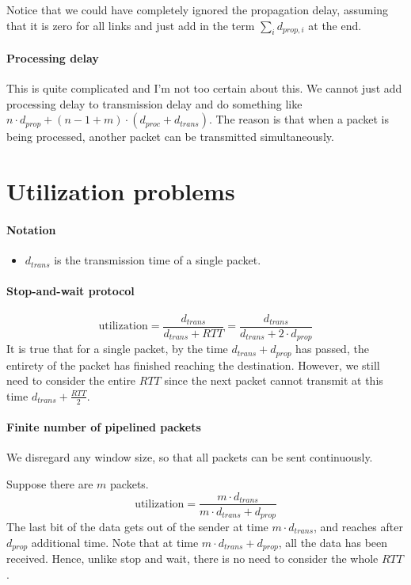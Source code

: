 \documentclass[a4paper]{article}
\newcommand{\rbracket}[1]{\left(#1\right)} %
\begin{document}
Notice that we could have completely ignored the propagation delay, assuming that it is zero for all links and just add in the term $\sum_i d_{prop, i}$ at the end.

\paragraph{Processing delay} This is quite complicated and I'm not too certain about this. We cannot just add processing delay to transmission delay and do something like $n\cdot d_{prop} + (n - 1 + m)\cdot \rbracket{d_{proc} + d_{trans}}$. The reason is that when a packet is being processed, another packet can be transmitted simultaneously.


\section{Utilization problems}
\paragraph{Notation}
\begin{itemize}
	\item $d_{trans}$ is the transmission time of a single packet.
\end{itemize}

\paragraph{Stop-and-wait protocol}

\begin{equation}
	\text{utilization} = \frac{d_{trans}}{d_{trans} + RTT} = \frac{d_{trans}}{d_{trans} + 2\cdot d_{prop}}
\end{equation}
It is true that for a single packet, by the time $d_{trans} + d_{prop}$ has passed, the entirety of the packet has finished reaching the destination. However, we still need to consider the entire $RTT$ since the next packet cannot transmit at this time $d_{trans} + \frac{RTT}{2}$.

\paragraph{Finite number of pipelined packets} We disregard any window size, so that all packets can be sent continuously.

Suppose there are $m$ packets.
\begin{equation}
	\text{utilization} = \frac{m\cdot d_{trans}}{m\cdot d_{trans} + d_{prop}}
\end{equation}
The last bit of the data gets out of the sender at time $m\cdot d_{trans}$, and reaches after $d_{prop}$ additional time. Note that at time $m\cdot d_{trans} + d_{prop}$, all the data has been received. Hence, unlike stop and wait, there is no need to consider the whole $RTT$.
\end{document}
